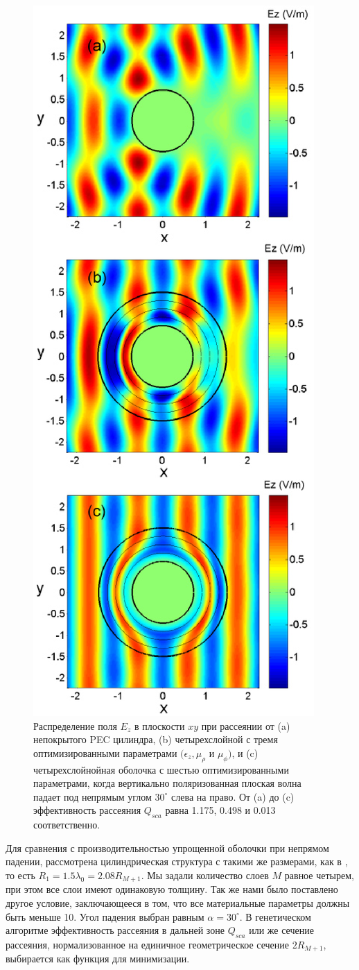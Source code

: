 \documentclass[a4paper, 12pt]{article}
\begin{document}
\begin{figure}
  \centering
  \includegraphics[width=0.5\columnwidth,draft=false]{Fig_2}
  \caption{
  Распределение поля $E_z$ в плоскости $xy$ при рассеянии от (a) непокрытого
  PEC цилиндра, (b) четырехслойной с тремя оптимизированными параметрами 
  $(\epsilon_z, \mu_\rho$ и $\mu_\phi)$, и (c) четырехслойнойная оболочка
  с шестью оптимизированными параметрами, когда вертикально поляризованная плоская волна падает под непрямым углом $30^{\circ}$ слева на право.
  От (a) до (c) эффективность рассеяния $Q_{sca}$ равна 
  1.175, 0.498 и 0.013 соответственно. }
  \label{fig:field}
\end{figure}

Для сравнения с производительностью упрощенной оболочки при непрямом падении,
рассмотрена цилиндрическая структура с такими же размерами, как в \cite{14},
то есть $R_1 = 1.5\lambda_0=2.08R_{M+1}$. Мы задали количество слоев $M$ 
равное четырем, при этом все слои имеют одинаковую толщину. Так же нами было
поставлено другое условие, заключающееся в том, что все материальные параметры
должны быть меньше 10. Угол падения выбран равным $\alpha = 30^\circ$.
В генетическом алгоритме эффективность рассеяния в дальней зоне $Q_{sca}$ 
\cite{7} или же сечение рассеяния, нормализованное на единичное геометрическое 
сечение $2R_{M+1}$, выбирается как функция для минимизации.
\end{document}
